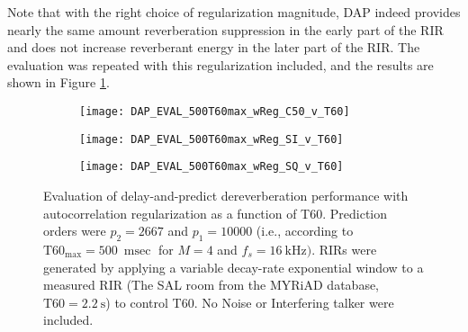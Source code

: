 Note that with the right choice of regularization magnitude, DAP indeed provides nearly the same amount reverberation suppression in the early part of the RIR and does not increase reverberant energy in the later part of the RIR. The evaluation was repeated with this regularization included, and the results are shown in Figure \ref{fig:DAP_EVAL_500T60max_wReg}.  

	

\begin{figure}[H]
	\centering
	\begin{subfigure}[b]{0.47\textwidth}
		\centering
		\texttt{[image: DAP\_EVAL\_500T60max\_wReg\_C50\_v\_T60]}
	\end{subfigure}
	\begin{subfigure}[b]{0.92\textwidth}
		\centering
		\texttt{[image: DAP\_EVAL\_500T60max\_wReg\_SI\_v\_T60]}
	\end{subfigure}
	\begin{subfigure}[b]{0.92\textwidth}
		\centering
		\texttt{[image: DAP\_EVAL\_500T60max\_wReg\_SQ\_v\_T60]}
	\end{subfigure}
	\caption[DAP evaluation with regularization and $p_2=2667$]{Evaluation of delay-and-predict dereverberation performance with autocorrelation regularization as a function of T60. Prediction orders were $p_2 = 2667$ and $p_1=10000$ (i.e., according to $\mathrm{T60}_{\mathrm{max}} = \qty{500}{\milli\sec}$ for $M=4$ and $f_s=\qty{16}{\kilo\hertz})$. RIRs were generated by applying a variable decay-rate exponential window to a measured RIR (The SAL room from the MYRiAD database, $\mathrm{T60} = \qty{2.2}{\second}$) to control T60. No Noise or Interfering talker were included. }
	\label{fig:DAP_EVAL_500T60max_wReg}
\end{figure}

